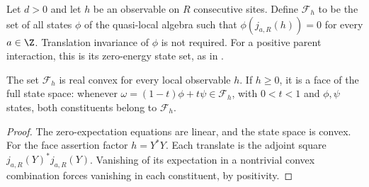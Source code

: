 \begin{definition}
    \label{def:quasi_local_parent_ground_state_face}
    \leanok
    Let $d>0$ and let $h$ be an observable on $R$ consecutive sites.
    Define $\mathcal F_h$ to be the set of all states $\phi$ of the
    quasi-local algebra such that $\phi(j_{a,R}(h))=0$ for every $a\in\Z$.
    Translation invariance of $\phi$ is not required.
    For a positive parent interaction, this is its zero-energy state set,
    as in \cite[Section~1 and Theorem~1.1]{Nachtergaele1996Spectral}.
\end{definition}

\begin{lemma}
    \label{thm:quasi_local_parent_ground_state_face_properties}
    \leanok
    The set $\mathcal F_h$ is real convex for every local observable $h$.
    If $h\ge0$, it is a face of the full state space: whenever
    $\omega=(1-t)\phi+t\psi\in\mathcal F_h$, with $0<t<1$ and
    $\phi,\psi$ states, both constituents belong to $\mathcal F_h$.
\end{lemma}
\begin{proof}
    \leanok
    The zero-expectation equations are linear, and the state space is
    convex. For the face assertion factor $h=Y^*Y$. Each translate is
    the adjoint square $j_{a,R}(Y)^*j_{a,R}(Y)$. Vanishing of its
    expectation in a nontrivial convex combination forces vanishing in
    each constituent, by positivity.
\end{proof}


